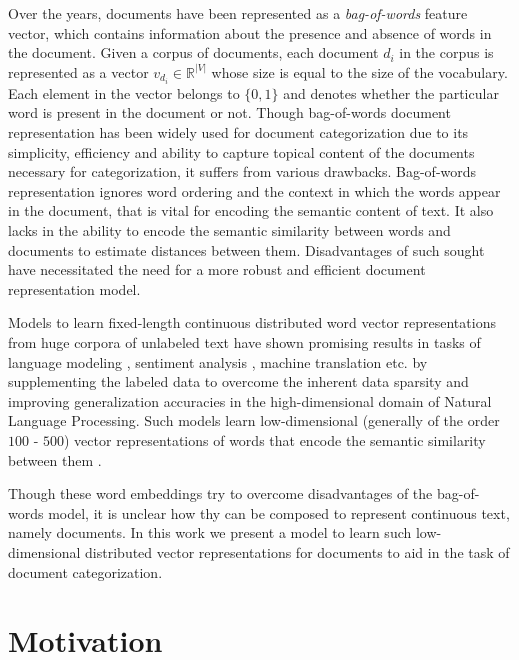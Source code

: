 Over the years, documents have been represented as a \emph{bag-of-words} feature vector, which contains information about the presence and absence of words in the document. Given a corpus of documents, each document $d_{i}$ in the corpus is represented as a vector $v_{d_{i}} \in \mathbb{R}^{|V|}$ whose size is equal to the size of the vocabulary. Each element in the vector belongs to $\{0, 1\}$ and denotes whether the particular word is present in the document or not. Though bag-of-words document representation has been widely used for document categorization due to its simplicity, efficiency and ability to capture topical content of the documents necessary for categorization, it suffers from various drawbacks. Bag-of-words representation ignores word ordering and the context in which the words appear in the document, that is vital for encoding the semantic content of text. It also lacks in the ability to encode the semantic similarity between words and documents to estimate distances between them. Disadvantages of such sought have necessitated the need for a more robust and efficient document representation model.

Models to learn fixed-length continuous distributed word vector representations from huge corpora of unlabeled text have shown promising results in tasks of language modeling \citep{bengio2003neural}, sentiment analysis \citep{socher2013recursive}, machine translation \citep{zou2013bilingual} etc. by supplementing the labeled data to overcome the inherent data sparsity and improving generalization accuracies in the high-dimensional domain of Natural Language Processing. Such models learn low-dimensional (generally of the order $100$ - $500$) vector representations of words that encode the semantic similarity between them \citep{mikolov2013efficient}. 

Though these word embeddings try to overcome disadvantages of the bag-of-words model, it is unclear how thy can be composed to represent continuous text, namely documents. In this work we present a model to learn such low-dimensional distributed vector representations for documents to aid in the task of document categorization.
 
\section{Motivation}

